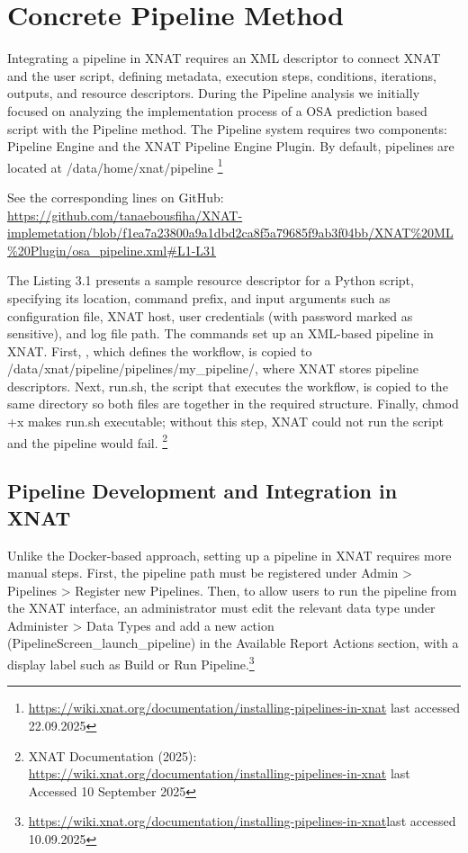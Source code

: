 
\section{Concrete Pipeline Method}

Integrating a pipeline in XNAT requires an \ac{XML} descriptor to connect XNAT and the user script, defining metadata, execution steps, conditions, iterations, outputs, and resource descriptors.
During the Pipeline analysis we initially focused on analyzing the implementation process of a OSA prediction based script with the Pipeline method. The Pipeline system requires two components: Pipeline Engine and the XNAT Pipeline Engine Plugin. By default, pipelines are located at /data/home/xnat/pipeline \footnote{\url{https://wiki.xnat.org/documentation/installing-pipelines-in-xnat} last accessed 22.09.2025}

\normalsize



\noindent\footnotesize See the corresponding lines on GitHub:\url{ https://github.com/tanaebousfiha/XNAT-implemetation/blob/f1ea7a23800a9a1dbd2ca8f5a79685f9ab3f04bb/XNAT%20ML%20Plugin/osa_pipeline.xml#L1-L31}
\normalsize

The  Listing 3.1 presents a sample resource descriptor for a Python script, specifying its location, command prefix, and input arguments such as configuration file, XNAT host, user credentials (with password marked as sensitive), and log file path. 
The commands set up an XML-based pipeline in XNAT. First, , which defines the workflow, is copied to /data/xnat/pipeline/pipelines/my\_pipeline/, where XNAT stores pipeline descriptors. Next, run.sh, the script that executes the workflow, is copied to the same directory so both files are together in the required structure. Finally, chmod +x makes run.sh executable; without this step, XNAT could not run the script and the pipeline would fail.
\footnote{XNAT Documentation (2025): \url{https://wiki.xnat.org/documentation/installing-pipelines-in-xnat} last Accessed 10 September 2025}
\normalsize
\subsection{Pipeline Development and Integration in XNAT}
Unlike the Docker-based approach, setting up a pipeline in XNAT requires more manual steps. First, the pipeline path must be registered under Admin > Pipelines > Register new Pipelines. Then, to allow users to run the pipeline from the XNAT interface, an administrator must edit the relevant data type under Administer > Data Types and add a new action (PipelineScreen\_launch\_pipeline) in the Available Report Actions section, with a display label such as Build or Run Pipeline.\footnote{\url{https://wiki.xnat.org/documentation/installing-pipelines-in-xnat}last accessed 10.09.2025}
\normalsize
